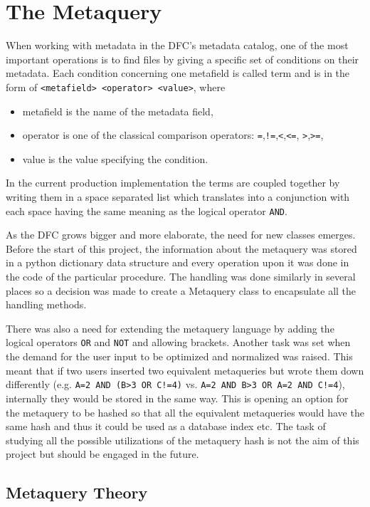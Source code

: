 \chapter{The Metaquery}

When working with metadata in the DFC's metadata catalog, one of the most important operations is 
to find files by giving a specific set of conditions on their metadata. Each condition concerning
one metafield is called term and is in the form of \texttt{<metafield> <operator> <value>}, where
\begin{itemize}
\item metafield is the name of the metadata field,
\item operator is one of the classical comparison operators: \texttt{=},\texttt{!=},\texttt{<},\texttt{<=},
	\texttt{>},\texttt{>=}, 
\item value is the value specifying the condition.
\end{itemize}

In the current production implementation the terms are coupled 
together by writing them in a space separated list which translates into a conjunction with
each space having the same meaning as the logical operator \texttt{AND}.

As the DFC grows bigger and more elaborate, the need for new classes emerges. Before the 
start of this project, the information about the metaquery was stored in a python dictionary
data structure and every operation upon it was done in the code of the particular procedure. 
The handling was done similarly in several places so a decision was made to create a 
Metaquery class to encapsulate all the handling methods. 

There was also a need for extending the metaquery language by adding the logical operators 
\texttt{OR} and \texttt{NOT} and allowing brackets. Another task was set when the demand for
the user input to be optimized and normalized was raised. This meant that if two users 
inserted two equivalent metaqueries but wrote them down 
differently (e.g. \texttt{A=2 AND (B>3 OR C!=4)} vs. \texttt{A=2 AND B>3 OR A=2 AND C!=4}), 
internally they would be stored in the same way. This is opening an option for the metaquery 
to be hashed so that all the equivalent metaqueries would have the same hash and thus it 
could be used as a database index etc. The task of studying all the possible utilizations of the 
metaquery hash is not the aim of this project but should be engaged in the future. 

\section{Metaquery Theory}

